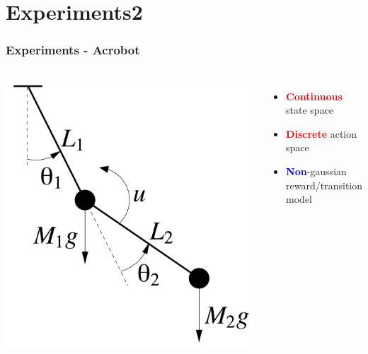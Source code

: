 \documentclass[professionalfont]{beamer}
\begin{document}
      \section{Experiments2}
        \begin{frame}
        \frametitle{Experiments - Acrobot}

        \begin{columns}
          \includegraphics[scale=0.25,left]{images/acrobot.png}

          \begin{itemize}
            \item \textcolor{red}{\textbf{Continuous}} state space
            \item \textcolor{red}{\textbf{Discrete}} action space
            \item \textcolor{blue}{\textbf{Non}}-gaussian reward/transition model
          \end{itemize}
        \end{columns}
        \end{frame}
\end{document}
